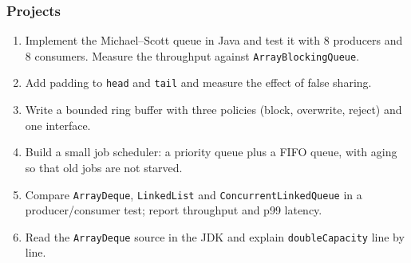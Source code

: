 \documentclass[aspectratio=169,10pt,compress]{beamer}
\begin{document}
\begin{frame}[t,fragile] \frametitle{Projects}
  \begin{enumerate}\small
    \item Implement the Michael--Scott queue in Java and test it with 8 producers and 8 consumers. Measure the throughput against \texttt{ArrayBlockingQueue}.
    \item Add padding to \texttt{head} and \texttt{tail} and measure the effect of false sharing.
    \item Write a bounded ring buffer with three policies (block, overwrite, reject) and one interface.
    \item Build a small job scheduler: a priority queue plus a FIFO queue, with aging so that old jobs are not starved.
    \item Compare \texttt{ArrayDeque}, \texttt{LinkedList} and \texttt{ConcurrentLinkedQueue} in a producer/consumer test; report throughput and p99 latency.
    \item Read the \texttt{ArrayDeque} source in the JDK and explain \texttt{doubleCapacity} line by line.
  \end{enumerate}
\end{frame}




\begin{frame}[t,fragile]
	\begin{center}
		\vspace{4cm}
	\end{center}
\end{frame}
\end{document}

